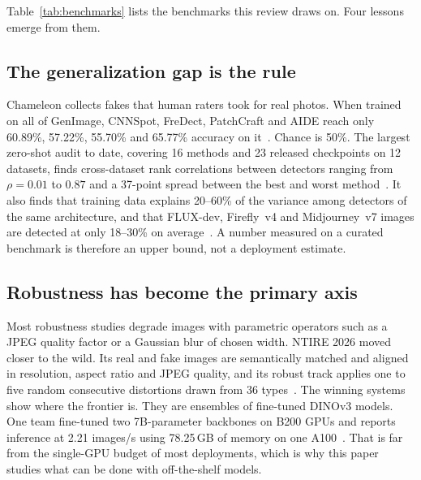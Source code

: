 \documentclass[conference]{IEEEtran}
\begin{document}
Table~\ref{tab:benchmarks} lists the benchmarks this review draws on. Four
lessons emerge from them.

\subsection{The generalization gap is the rule}
Chameleon collects fakes that human raters took for real photos. When
trained on all of GenImage, CNNSpot, FreDect, PatchCraft and AIDE reach only
60.89\%, 57.22\%, 55.70\% and 65.77\% accuracy on it~\cite{yan2025aide}.
Chance is 50\%. The largest zero-shot audit to date, covering 16 methods and
23 released checkpoints on 12 datasets, finds cross-dataset rank
correlations between detectors ranging from $\rho = 0.01$ to $0.87$ and a
37-point spread between the best and worst method~\cite{ren2026outofbox}.
It also finds that training data explains 20--60\% of the variance among
detectors of the same architecture, and that FLUX-dev, Firefly~v4 and
Midjourney~v7 images are detected at only 18--30\% on
average~\cite{ren2026outofbox}. A number measured on a curated benchmark is
therefore an upper bound, not a deployment estimate.

\subsection{Robustness has become the primary axis}
Most robustness studies degrade images with parametric operators such as a
JPEG quality factor or a Gaussian blur of chosen width. NTIRE 2026 moved
closer to the wild. Its real and fake images are semantically matched and
aligned in resolution, aspect ratio and JPEG quality, and its robust track
applies one to five random consecutive distortions drawn from 36
types~\cite{ntire2026robust}. The winning systems show where the frontier is.
They are ensembles of fine-tuned DINOv3 models. One team fine-tuned two
7B-parameter backbones on B200 GPUs and reports inference at 2.21 images/s
using 78.25\,GB of memory on one A100~\cite{ntire2026robust}. That is far
from the single-GPU budget of most deployments, which is why this paper
studies what can be done with off-the-shelf models.
\end{document}
